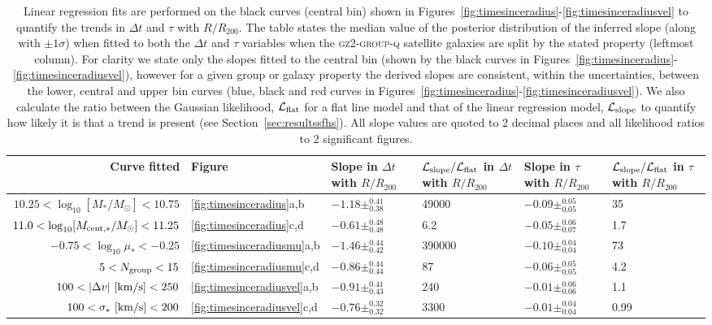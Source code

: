 \documentclass[useAMS,usenatbib]{mn2e}
\def\minor		{\color{minorcol}}
\begin{document}
\begin{table}

\centering
\caption{Linear regression fits are performed on the black curves (central bin) shown in Figures~\ref{fig:timesinceradius}-\ref{fig:timesinceradiusvel} to quantify the trends in $\Delta t$ and $\tau$ with $R/R_{200}$. The table states the median value of the posterior distribution of the inferred slope (along with $\pm1\sigma$) when fitted to both the $\Delta t$ and $\tau$ variables when the \textsc{gz2-group-q} satellite galaxies are split by the stated property (leftmost column). For clarity we state only the slopes fitted to the central bin (shown by the black curves in Figures~\ref{fig:timesinceradius}-\ref{fig:timesinceradiusvel}), however for a given group or galaxy property the derived slopes are consistent, within the uncertainties, between the lower, central and upper bin curves (blue, black and red curves in Figures~\ref{fig:timesinceradius}-\ref{fig:timesinceradiusvel}). {\minor We also calculate the ratio between the Gaussian likelihood, $\mathcal{L}_{\rm{flat}}$ for a flat line model and that of the linear regression model, $\mathcal{L}_{\rm{slope}}$ to quantify how likely it is that a trend is present (see Section~\ref{sec:resultssfhs}).  All slope values are quoted to 2 decimal places and all likelihood ratios to 2 significant figures.}}
\label{table:resultsum}
%
%
%
\setlength\extrarowheight{3pt}
\begin{tabularx}{\textwidth}{r|C|C|C|C|C}

\hline
Curve fitted & Figure & Slope in $\Delta t$ with $R/R_{200}$  & $\mathcal{L}_{\rm{slope}}/\mathcal{L}_{\rm{flat}}$ in  $\Delta t$ with $R/R_{200}$   & Slope in $\tau$ with $R/R_{200}$  & $\mathcal{L}_{\rm{slope}}/\mathcal{L}_{\rm{flat}}$ in $\tau$ with $R/R_{200}$       \\ \hline 
$10.25 < \log_{10}[M_*/M_{\odot}] < 10.75$                 & \ref{fig:timesinceradius}a,b           & $-1.18\pm_{0.38}^{0.41}$ & 49000 & $-0.09\pm_{0.05}^{0.05}$ & 35 \\
$11.0 < \log_{10}[M_{\rm{cent},*}/M_{\odot}] < 11.25$     & \ref{fig:timesinceradius}c,d           & $-0.61\pm_{0.48}^{0.48}$ & 6.2 & $-0.05\pm_{0.07}^{0.06}$ & 1.7 \\
$-0.75 < \log_{10}\mu_* < -0.25$               & \ref{fig:timesinceradiusmu}a,b         & $-1.46\pm_{0.42}^{0.44}$ & 390000 & $-0.10\pm_{0.04}^{0.04}$ & 73 \\
$5 < N_{\rm{group}}< 15$      & \ref{fig:timesinceradiusmu}c,d         & $-0.86\pm_{0.44}^{0.44}$ & 87 & $-0.06\pm_{0.05}^{0.05}$ & 4.2 \\
$100 < |\Delta v|~[\rm{km/s}] < 250$          & \ref{fig:timesinceradiusvel}a,b        & $-0.91\pm_{0.43}^{0.41}$ & 240& $-0.01\pm_{0.06}^{0.06}$ & 1.1 \\
$100 < \sigma_*~[\rm{km/s}] < 200$            & \ref{fig:timesinceradiusvel}c,d        & $-0.76\pm_{0.32}^{0.32}$ & 3300 & $-0.01\pm_{0.04}^{0.04}$ & 0.99 \\ \hline
\end{tabularx}
\end{table}
\end{document}
